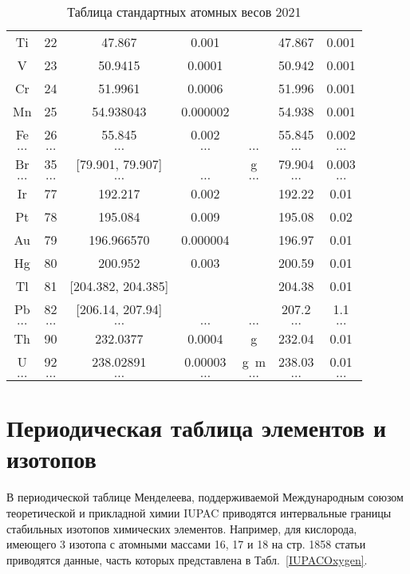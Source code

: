 \documentclass[a5paper,openany]{book}
\begin{document}
\begin{table}[h!]
{\begin{tabular}{ccccccc}
Ti & 22 & 47.867 & 0.001 & ~  & 47.867 & 0.001\\ [1mm]
V & 23 & 50.9415 & 0.0001 & ~  & 50.942 & 0.001\\ [1mm]
Cr & 24 & 51.9961 & 0.0006 & ~  & 51.996 & 0.001\\ [1mm]
Mn & 25 & 54.938043 & 0.000002 & ~  & 54.938 & 0.001\\ [1mm]
Fe & 26 & 55.845 & 0.002 & ~  & 55.845 & 0.002\\ [1mm]
$\ldots$ & $\ldots$ & $\ldots$ & $\ldots$ & $\ldots$  & $\ldots$ & $\ldots$\\ [1mm]
Br & 35 & [79.901, 79.907] & ~ & g  & 79.904 & 0.003\\ [1mm]
$\ldots$ & $\ldots$ & $\ldots$ & $\ldots$ & $\ldots$  & $\ldots$ & $\ldots$\\ [1mm]
Ir & 77 &  192.217 & 0.002 & ~  & 192.22 & 0.01\\ [1mm]
Pt & 78 & 195.084 & 0.009 & ~  & 195.08 & 0.02\\ [1mm]
Au & 79 & 196.966570 & 0.000004 & ~  & 196.97 & 0.01\\ [1mm]
Hg & 80 & 200.952 & 0.003 & ~  & 200.59 & 0.01\\ [1mm]
Tl & 81 & [204.382, 204.385] & ~ & ~  & 204.38 & 0.01\\ [1mm]
Pb & 82 & [206.14, 207.94] & ~ & ~  & 207.2 & 1.1\\ [1mm]
$\ldots$ & $\ldots$ & $\ldots$ & $\ldots$ & $\ldots$  & $\ldots$ & $\ldots$\\ [1mm]
Th & 90 & 232.0377 & 0.0004 & g  & 232.04 & 0.01\\ [1mm]
U & 92 & 238.02891 & 0.00003 & g~m  & 238.03 & 0.01\\ [1mm]
$\ldots$ & $\ldots$ & $\ldots$ & $\ldots$ & $\ldots$  & $\ldots$ & $\ldots$\\ [1mm]
			\hline 
			\end{tabular}
	}
	\caption{Таблица стандартных атомных весов 2021}
	\label{t:TSAW2021}
\end{table} 




\chapter{Периодическая таблица элементов и изотопов} \label{s:IPTEI}



В периодической таблице Менделеева, поддерживаемой Международным союзом теоретической 
и прикладной химии IUPAC приводятся интервальные границы стабильных изотопов химических 
элементов. Например, для кислорода, имеющего 3 изотопа с атомными массами 16, 17 и 18 
на стр. 1858 статьи \cite{IUPAC} приводятся данные, часть которых представлена 
в Табл.~\ref{IUPACOxygen}. 
\end{document}
